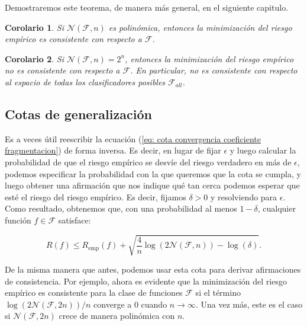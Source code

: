 \documentclass{report}
\newtheorem{cor}{Corolario}[thm]
\begin{document}
Demostraremos este teorema, de manera más general, en el siguiente capitulo.

\begin{cor}
    Si $\mathcal{N}(\mathcal{F}, n)$ es polinómica, entonces la minimización del riesgo empírico es consistente con respecto a $\mathcal{F}$.\\
\end{cor}
\begin{cor}
    Si $\mathcal{N}(\mathcal{F}, n)=2^n$, entonces la minimización del riesgo empírico no es consistente con respecto a $\mathcal{F}$. En 
    particular, no es consistente con respecto al espacio de todas los clasificadores posibles $\mathcal{F}_{all}$.
\end{cor}

\subsection{Cotas de generalización}

Es a veces útil reescribir la ecuación (\ref{eq: cota convergencia coeficiente fragmentacion}) de forma inversa. Es decir, en lugar de 
fijar \(\epsilon\) y 
luego calcular la probabilidad de que el riesgo empírico se desvíe del riesgo verdadero en más de \(\epsilon\), 
podemos especificar la probabilidad con la que queremos que la cota se cumpla, y luego obtener una afirmación 
que nos indique qué tan cerca podemos esperar que esté el riesgo del riesgo empírico. Es decir, fijamos \(\delta > 0\) 
y resolviendo para \(\epsilon\). Como resultado, obtenemos que, con una probabilidad al menos \(1 - \delta\), cualquier 
función \(f \in \mathcal{F}\) satisface:

\begin{equation}
    R(f) \leq R_{\text{emp}}(f) + \sqrt{\frac{4}{n} \log(2\mathcal{N}(\mathcal{F}, n)) - \log(\delta)}. \label{eq: cota generalizacion}
\end{equation}
\newline

De la misma manera que antes, podemos usar esta cota para derivar afirmaciones de consistencia. Por ejemplo, 
ahora es evidente que la minimización del riesgo empírico es consistente para la clase de funciones \(\mathcal{F}\) 
si el término \(\log(2\mathcal{N}(\mathcal{F}, 2n))/n\) converge a \(0\) cuando \(n \to \infty\). Una vez más, 
este es el caso si \(\mathcal{N}(\mathcal{F}, 2n)\) crece de manera polinómica con \(n\).\newline
\end{document}
